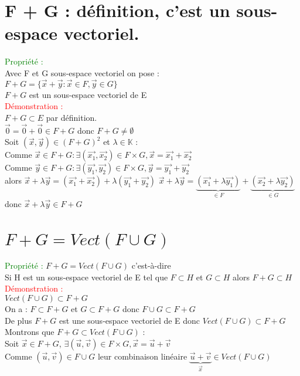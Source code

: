 \documentclass{article}
\begin{document}
\section{F + G : définition, c'est un sous-espace vectoriel.}
\textcolor{green}{Propriété :} \\
Avec F et G sous-espace vectoriel on pose : \\ 
$F +G = \lbrace \vec{x}+ \vec{y} : \vec{x} \in F, \vec{y} \in G \rbrace$ \\ 
$F+G$ est un sous-espace vectoriel de E \\ 
\textcolor{red}{Démonstration :} \\ 
$F +G \subset E$ par définition. \\ 
$\vec{0}=\vec{0}+\vec{0} \in F +G$ donc $F+G \neq \emptyset$ \\ 
Soit $(\vec{x},\vec{y}) \in (F+G)^2$ et $\lambda \in \mathbb{K}$ : \\ 
Comme $\vec{x}\in F+G: \exists (\vec{x_1},\vec{x_2}) \in F \times G, \vec{x}= \vec{x_1} + \vec{x_2}$ \\ 
Comme $\vec{y}\in F+G: \exists (\vec{y_1},\vec{y_2}) \in F \times G, \vec{y}= \vec{y_1} + \vec{y_2}$ \\ 
alors $\vec{x}+ \lambda \vec{y}=(\vec{x_1}+ \vec{x_2})+ \lambda (\vec{y_1} + \vec{y_2})$
$\vec{x}+ \lambda \vec{y}=\underbrace{(\vec{x_1}+ \lambda \vec{y_1})}_{\in F}+\underbrace{(\vec{x_2} + \lambda \vec{y_2})}_{\in G}$ \\ 
donc $\vec{x}+ \lambda \vec{y} \in F+G$
\section{$F+ G = Vect(F\cup G)$}
\textcolor{green}{Propriété :} $F+G = Vect(F \cup G)$ c'est-à-dire \\ 
Si H est un sous-espace vectoriel de E tel que $F \subset H$ et $G \subset H$ alors $F+G \subset H$ \\ 
\textcolor{red}{Démonstration :} \\ 
$Vect(F \cup G) \subset F+G$ \\ 
On a : $F \subset F+G$ et $G \subset F+G$ donc $F \cup G \subset F+G$ \\ 
De plus $F+G$ est une sous-espace vectoriel de E donc $Vect(F \cup G) \subset F+G$ \\ 
Montrons que $F+G \subset Vect(F \cup G)$ : \\ 
Soit $\vec{x} \in F +G$, $\exists(\vec{u},\vec{v})\in F\times G, \vec{x}=\vec{u}+\vec{v}$ \\ 
Comme $(\vec{u},\vec{v}) \in F \cup G$ leur combinaison linéaire $\underbrace{\vec{u}+\vec{v}}_{\vec{x}} \in Vect(F \cup G) $
\end{document}
